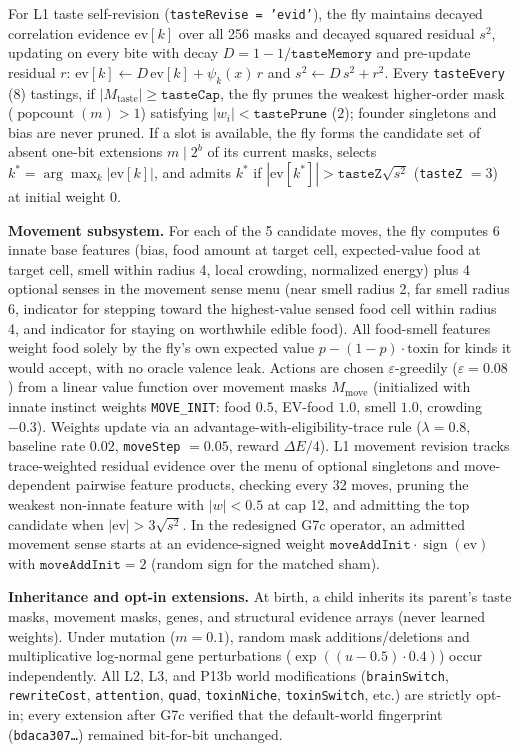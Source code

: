 For L1 taste self-revision (\texttt{tasteRevise = 'evid'}), the fly maintains decayed correlation evidence $\text{ev}[k]$ over all 256 masks and decayed squared residual $s^2$, updating on every bite with decay $D = 1 - 1/\texttt{tasteMemory}$ and pre-update residual $r$: $\text{ev}[k] \leftarrow D\,\text{ev}[k] + \psi_k(x)\,r$ and $s^2 \leftarrow D\,s^2 + r^2$. Every \texttt{tasteEvery} ($8$) tastings, if $|M_{\text{taste}}| \ge \texttt{tasteCap}$, the fly prunes the weakest higher-order mask ($\operatorname{popcount}(m)>1$) satisfying $|w_i| < \texttt{tastePrune}$ ($2$); founder singletons and bias are never pruned. If a slot is available, the fly forms the candidate set of absent one-bit extensions $m \mid 2^b$ of its current masks, selects $k^* = \arg\max_k |\text{ev}[k]|$, and admits $k^*$ if $|\text{ev}[k^*]| > \texttt{tasteZ}\sqrt{s^2}$ (\texttt{tasteZ} $=3$) at initial weight 0.

\textbf{Movement subsystem.} For each of the 5 candidate moves, the fly computes 6 innate base features (bias, food amount at target cell, expected-value food at target cell, smell within radius 4, local crowding, normalized energy) plus 4 optional senses in the movement sense menu (near smell radius 2, far smell radius 6, indicator for stepping toward the highest-value sensed food cell within radius 4, and indicator for staying on worthwhile edible food). All food-smell features weight food solely by the fly's own expected value $p - (1-p)\cdot\text{toxin}$ for kinds it would accept, with no oracle valence leak. Actions are chosen $\varepsilon$-greedily ($\varepsilon = 0.08$) from a linear value function over movement masks $M_{\text{move}}$ (initialized with innate instinct weights \texttt{MOVE\_INIT}: food $0.5$, EV-food $1.0$, smell $1.0$, crowding $-0.3$). Weights update via an advantage-with-eligibility-trace rule ($\lambda = 0.8$, baseline rate $0.02$, \texttt{moveStep} $=0.05$, reward $\Delta E / 4$). L1 movement revision tracks trace-weighted residual evidence over the menu of optional singletons and move-dependent pairwise feature products, checking every 32 moves, pruning the weakest non-innate feature with $|w| < 0.5$ at cap 12, and admitting the top candidate when $|\text{ev}| > 3\sqrt{s^2}$. In the redesigned G7c operator, an admitted movement sense starts at an evidence-signed weight $\texttt{moveAddInit} \cdot \operatorname{sign}(\text{ev})$ with $\texttt{moveAddInit}=2$ (random sign for the matched sham).

\textbf{Inheritance and opt-in extensions.} At birth, a child inherits its parent's taste masks, movement masks, genes, and structural evidence arrays (never learned weights). Under mutation ($m=0.1$), random mask additions/deletions and multiplicative log-normal gene perturbations ($\exp((u-0.5)\cdot 0.4)$) occur independently. All L2, L3, and P13b world modifications (\texttt{brainSwitch}, \texttt{rewriteCost}, \texttt{attention}, \texttt{quad}, \texttt{toxinNiche}, \texttt{toxinSwitch}, etc.) are strictly opt-in; every extension after G7c verified that the default-world fingerprint (\texttt{bdaca307\dots}) remained bit-for-bit unchanged.

